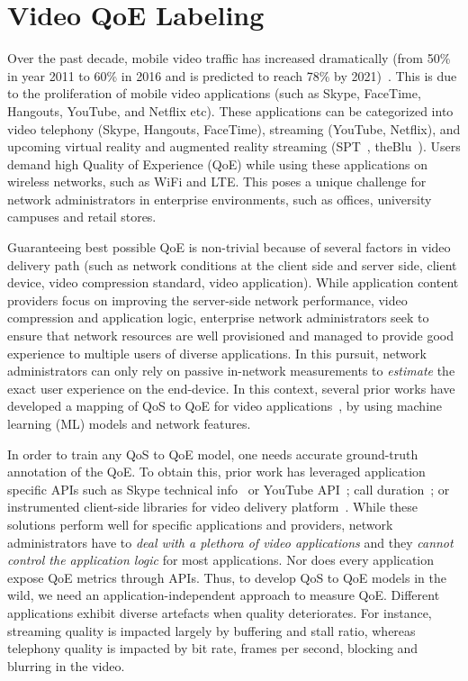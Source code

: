 \section{Video QoE Labeling}

Over the past decade, mobile video traffic has increased dramatically (from 50\% in year 2011 to 60\% in 2016 and is predicted to reach 78\% by 2021)~\cite{forecast2016cisco}. This is due to the proliferation of mobile video applications (such as Skype, FaceTime, Hangouts, YouTube, and Netflix etc). These applications can be categorized into video telephony (Skype, Hangouts, FaceTime), streaming (YouTube, Netflix), and upcoming virtual reality and augmented reality streaming (SPT~\cite{spt}, theBlu~\cite{theblu}). 
Users demand high Quality of Experience (QoE) while using these applications on wireless networks, such as WiFi and LTE. This poses a unique challenge for network administrators in enterprise environments, such as offices, university campuses and retail stores.

Guaranteeing best possible QoE is non-trivial because of several factors in video delivery path (such as network conditions at the client side and server side, client device, video compression standard, video application). 
While application content providers focus on improving the server-side network performance, video compression and application logic, enterprise network administrators seek to ensure that network resources are well provisioned and managed to provide good experience to multiple users of diverse applications. 
In this pursuit, network administrators can only rely on passive in-network measurements to {\em estimate} the exact user experience on the end-device. 
In this context, several prior works have developed a mapping of QoS to QoE for video applications~\cite{balachandran2013developing,aggarwal2014prometheus,fiedler2010generic}, by using machine learning (ML) models and network features.

In order to train any QoS to QoE model, one needs accurate ground-truth annotation of the QoE. To obtain this, prior work has leveraged application specific APIs such as Skype technical info~\cite{zhang2012profiling} or YouTube API~\cite{aggarwal2014prometheus}; call duration~\cite{chen2006quantifying}; or instrumented client-side libraries for video delivery platform~\cite{balachandran2013developing}. While these solutions perform well for specific applications and providers, network administrators have to \emph{deal with a plethora of video applications} and they \emph{cannot control the application logic} for most applications. Nor does every application expose QoE metrics through APIs. 
Thus, to develop QoS to QoE models in the wild, we need an application-independent approach to measure QoE. 
Different applications exhibit diverse artefacts when quality deteriorates. 
For instance, streaming quality is impacted largely by buffering and stall ratio, whereas telephony quality is impacted by bit rate, frames per second, blocking and blurring in the video.

